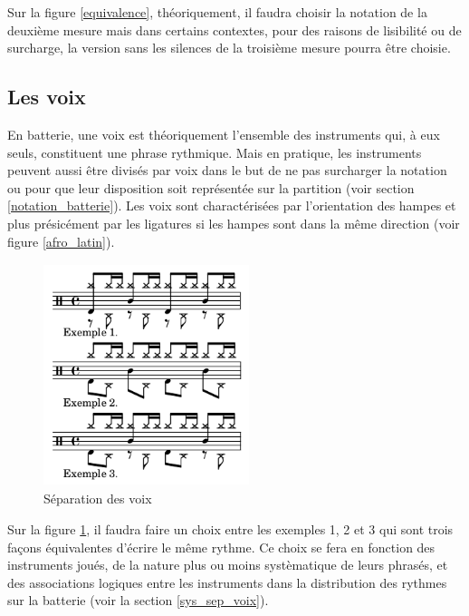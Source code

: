 Sur la figure \ref{equivalence}, théoriquement, il faudra choisir la notation
de la deuxième mesure mais dans certains contextes, pour des raisons de
lisibilité ou de surcharge, la version sans les silences de la troisième mesure
pourra être choisie.

\subsection*{Les voix}


En batterie, une voix est théoriquement l’ensemble des instruments qui, à eux
seuls, constituent une phrase rythmique. Mais en pratique, les instruments
peuvent aussi être divisés par voix dans le but de ne pas surcharger la
notation ou pour que leur disposition soit représentée sur la
partition (voir section \ref{notation_batterie}).
Les voix sont charactérisées par l’orientation des hampes et plus présicément
par les ligatures si les hampes sont dans la même direction (voir figure
\ref{afro_latin}).

\begin{figure}[h]
	\centering
	\includegraphics[height=65mm, width=60mm]{
    z_images/3_methodes/0_notation_de_la_batterie/7_voix.png}
	\caption{Séparation des voix}
	\label{sep_voix}
\end{figure}
Sur la figure \ref{sep_voix}, il faudra faire un choix entre les exemples 1, 2
et 3 qui sont trois façons équivalentes d’écrire le même rythme.
Ce choix se fera en fonction des instruments joués, de la nature plus ou moins
systèmatique de leurs phrasés, et des associations logiques entre les
instruments dans la distribution des rythmes sur la batterie (voir la section
\ref{sys_sep_voix}).

